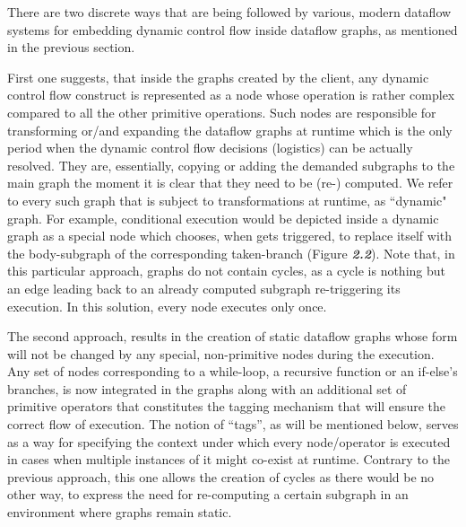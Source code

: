 \documentclass[ack,preface]{dithesis}
\begin{document}
There are two discrete ways that are being followed by various, modern dataflow systems for embedding dynamic control flow inside dataflow graphs, as mentioned in the previous section. 

First one suggests, that inside the graphs created by the client, any dynamic control flow construct is represented as a node whose operation is rather complex compared to all the other primitive operations. Such nodes are responsible for transforming or/and expanding the dataflow graphs at runtime which is the only period when the dynamic control flow decisions (logistics) can be actually resolved. They are, essentially, copying or adding the demanded subgraphs to the main graph the moment it is clear that they need to be (re-) computed. We refer to every such graph that is subject to transformations at runtime, as ``dynamic" graph.  For example, conditional execution would be depicted inside a dynamic graph as a special node which chooses, when gets triggered, to replace itself with the body-subgraph of the corresponding taken-branch (Figure \textit{\textbf{2.2}}).
Note that, in this particular approach, graphs do not contain cycles, as a cycle is nothing but an edge leading back to an already computed subgraph re-triggering its execution. In this solution, every node executes only once. 

The second approach, results in the creation of static dataflow graphs whose form will not be changed by any special, non-primitive nodes during the execution. Any set of nodes corresponding to a while-loop, a recursive function or an if-else’s branches, is now integrated in the graphs along with an additional set of primitive operators that constitutes the tagging mechanism that will ensure the correct flow of execution. The notion of “tags”, as will be mentioned below, serves as a way for specifying the context under which every node/operator is executed in cases when multiple instances of it might co-exist at runtime. Contrary to the previous approach, this one allows the creation of cycles as there would be no other way, to express the need for re-computing a certain subgraph in an environment where graphs remain static. 
\end{document}

